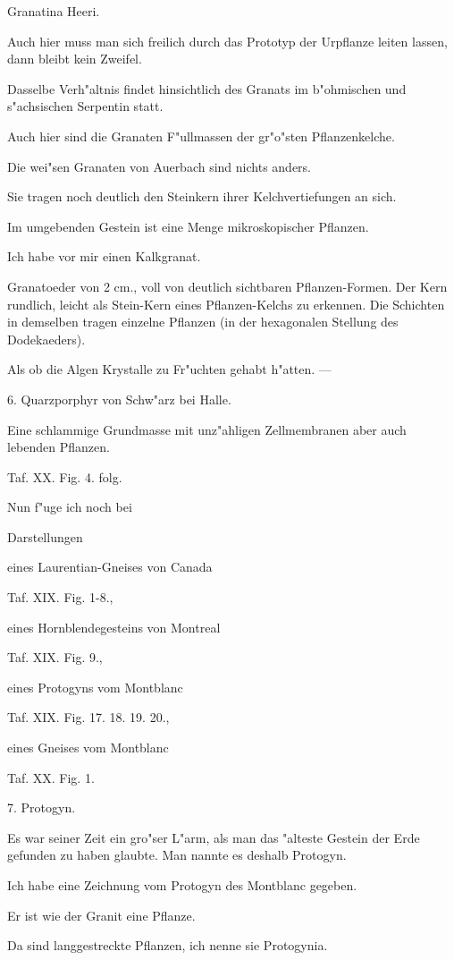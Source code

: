 \documentclass[a4paper, 11pt, oneside, german]{article}
\begin{document}
Granatina Heeri.

Auch hier muss man sich freilich durch das Prototyp der Urpflanze leiten lassen, dann bleibt kein Zweifel.

Dasselbe Verh"altnis findet hinsichtlich des Granats im b"ohmischen und s"achsischen Serpentin statt.

Auch hier sind die Granaten F"ullmassen der gr"o"sten Pflanzenkelche.

Die wei"sen Granaten von Auerbach sind nichts anders.

Sie tragen noch deutlich den Steinkern ihrer Kelchvertiefungen an sich.

Im umgebenden Gestein ist eine Menge mikroskopischer Pflanzen.

Ich habe vor mir einen Kalkgranat.

Granatoeder von 2 cm., voll von deutlich sichtbaren Pflanzen-Formen. Der Kern rundlich, leicht als Stein-Kern eines Pflanzen-Kelchs zu erkennen. Die Schichten in demselben tragen einzelne Pflanzen (in der hexagonalen Stellung des Dodekaeders).

Als ob die Algen Krystalle zu Fr"uchten gehabt h"atten. ---

6. Quarzporphyr von Schw"arz bei Halle.

Eine schlammige Grundmasse mit unz"ahligen Zellmembranen aber auch lebenden Pflanzen.

Taf. XX. Fig. 4. folg.

Nun f"uge ich noch bei

Darstellungen

eines Laurentian-Gneises von Canada

Taf. XIX. Fig. 1-8.,

eines Hornblendegesteins von Montreal

Taf. XIX. Fig. 9.,

eines Protogyns vom Montblanc

Taf. XIX. Fig. 17. 18. 19. 20.,

eines Gneises vom Montblanc

Taf. XX. Fig. 1.

7. Protogyn.

Es war seiner Zeit ein gro"ser L"arm, als man das "alteste Gestein der Erde gefunden zu haben glaubte. Man nannte es deshalb Protogyn.

Ich habe eine Zeichnung vom Protogyn des Montblanc gegeben.

Er ist wie der Granit eine Pflanze.

Da sind langgestreckte Pflanzen, ich nenne sie Protogynia.
\end{document}
